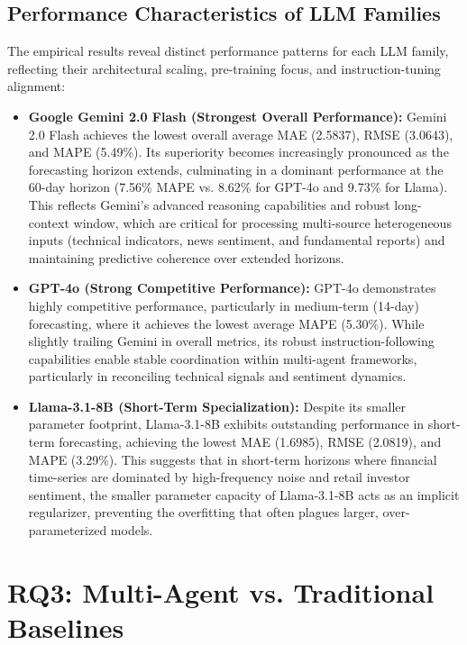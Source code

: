 \documentclass{ieeeaccess}
\begin{document}
\subsection{Performance Characteristics of LLM Families}
The empirical results reveal distinct performance patterns for each LLM family, reflecting their architectural scaling, pre-training focus, and instruction-tuning alignment:
\begin{itemize}
    \item \textbf{Google Gemini 2.0 Flash (Strongest Overall Performance):} Gemini 2.0 Flash achieves the lowest overall average MAE (2.5837), RMSE (3.0643), and MAPE (5.49\%). Its superiority becomes increasingly pronounced as the forecasting horizon extends, culminating in a dominant performance at the 60-day horizon (7.56\% MAPE vs. 8.62\% for GPT-4o and 9.73\% for Llama). This reflects Gemini's advanced reasoning capabilities and robust long-context window, which are critical for processing multi-source heterogeneous inputs (technical indicators, news sentiment, and fundamental reports) and maintaining predictive coherence over extended horizons.
    \item \textbf{GPT-4o (Strong Competitive Performance):} GPT-4o demonstrates highly competitive performance, particularly in medium-term (14-day) forecasting, where it achieves the lowest average MAPE (5.30\%). While slightly trailing Gemini in overall metrics, its robust instruction-following capabilities enable stable coordination within multi-agent frameworks, particularly in reconciling technical signals and sentiment dynamics.
    \item \textbf{Llama-3.1-8B (Short-Term Specialization):} Despite its smaller parameter footprint, Llama-3.1-8B exhibits outstanding performance in short-term forecasting, achieving the lowest MAE (1.6985), RMSE (2.0819), and MAPE (3.29\%). This suggests that in short-term horizons where financial time-series are dominated by high-frequency noise and retail investor sentiment, the smaller parameter capacity of Llama-3.1-8B acts as an implicit regularizer, preventing the overfitting that often plagues larger, over-parameterized models.
\end{itemize}

\clearpage
\section{RQ3: Multi-Agent vs. Traditional Baselines}
\end{document}
